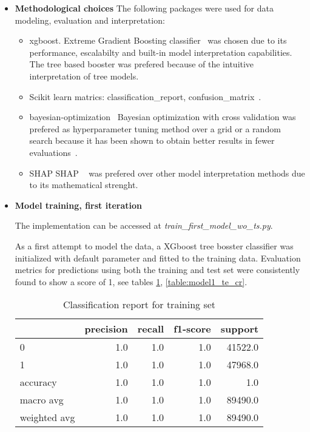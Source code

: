\documentclass{article}
\begin{document}
{\begin{itemize}
\item \textbf{Methodological choices}
The following packages were used for data modeling, evaluation and interpretation:
\begin{itemize}
	\item xgboost.
	Extreme Gradient Boosting classifier~\cite{DBLP:journals/corr/ChenG16} was chosen due to its performance, escalabilty and built-in model interpretation capabilities.
The tree based booster was prefered because of the intuitive interpretation of tree models.
	\item Scikit learn matrics: classification\_report, confusion\_matrix~\cite{pedregosa2011scikit}.
	\item bayesian-optimization~\cite{nogueiraBayOpt}
	Bayesian optimization with cross validation was prefered as hyperparameter tuning method over a grid or a random search because it has been shown to obtain better results in fewer evaluations~\cite{snoek2012practical, NIPS2011_4443}.

	\item SHAP
	SHAP ~\cite{DBLP:journals/corr/LundbergL17, lundberg2020local2global} was prefered over other model interpretation methods due to its mathematical strenght.
\end{itemize}

\item \textbf{Model training, first iteration}

The implementation can be accessed at \emph{train\_first\_model\_wo\_ts.py}.

As a first attempt to model the data, a XGboost tree bosster classifier was initialized with default parameter and fitted to the training data. Evaluation metrics for predictions using both the training and test set were consistently found to show a score of 1, see tables \ref{table:model1_tr_cr}, \ref{table:model1_te_cr}.

\begin{table}[h!]
\centering
\begin{tabular}{lrrrr}
\toprule
{} &  precision &  recall &  f1-score &  support \\
\midrule
0            &        1.0 &     1.0 &       1.0 &  41522.0 \\
1            &        1.0 &     1.0 &       1.0 &  47968.0 \\
accuracy     &        1.0 &     1.0 &       1.0 &      1.0 \\
macro avg    &        1.0 &     1.0 &       1.0 &  89490.0 \\
weighted avg &        1.0 &     1.0 &       1.0 &  89490.0 \\
\bottomrule
\end{tabular}
\caption{Classification report for training set}
\label{table:model1_tr_cr}
\end{table}


\end{itemize}}
\end{document}
